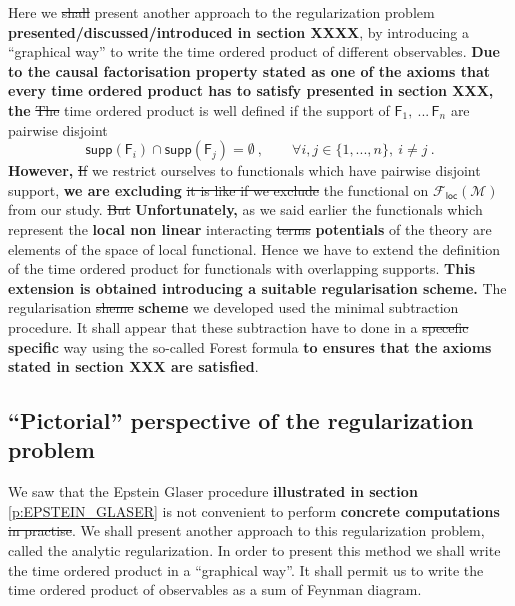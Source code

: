 \documentclass[11pt]{book}
\newcommand{\com}[1]{{\color{red}\bf #1}}
\newcommand{\sbar}[1]{\sout{\color{red} #1}}
\newcommand{\supp}{\mathsf{supp}}
\newcommand{\Fcal}{\mathcal{F}}
\newcommand{\Mcal}{\mathcal{M}}
\newcommand{\Fsf}{\mathsf{F}}
\theoremstyle{break}
\begin{document}
\bigskip


Here we \sbar{shall} present another approach to the regularization problem \com{presented/discussed/introduced in section XXXX}, by introducing a ``graphical way'' to write the time ordered product of different observables. 
\com{Due to the causal factorisation property stated as one of the axioms that every time ordered product has to satisfy presented in section XXX, the}
\sbar{The} time ordered product is well defined if the support of $\Fsf_1, \ ... \, \Fsf_n$ are pairwise disjoint
%
\begin{equation*}
\supp(\Fsf_i) \cap \supp(\Fsf_j) = \emptyset \ , \qquad \forall i , j \in \{1,...,n\}, \ i \neq j \ . 
\end{equation*}
%
\com{However, }\sbar{If} we restrict ourselves to functionals which have pairwise disjoint support, \com{we are excluding} \sbar{it is like if we exclude} the functional on $\Fcal_\mathsf{loc}(\Mcal)$ from our study. \sbar{But} \com{Unfortunately, } as we said earlier the functionals which represent the \com{local non linear} interacting \sbar{terms} \com{potentials} of the theory are elements of the space of local functional. Hence we have to extend the definition of the time ordered product for functionals with overlapping supports. \com{This extension is obtained introducing a suitable regularisation scheme.} The regularisation \sbar{sheme} \com{scheme} we developed used the minimal subtraction procedure. It shall appear that these subtraction have to done in a \sbar{specefic} \com{specific} way using the so-called Forest formula \com{to ensures that the axioms stated in section XXX are satisfied}.


\subsection{``Pictorial'' perspective of the regularization problem}
\label{p:PIC_REG_PB}


We saw that the Epstein Glaser procedure \com{illustrated in section} \ref{p:EPSTEIN_GLASER} is not convenient to perform \com{concrete computations}\sbar{in practise}. We shall present another approach to this regularization problem, called the analytic regularization. In order to present this method we shall write the time ordered product in a ``graphical way''. It shall permit us to write the time ordered product of observables as a sum of Feynman diagram. 
\end{document}
